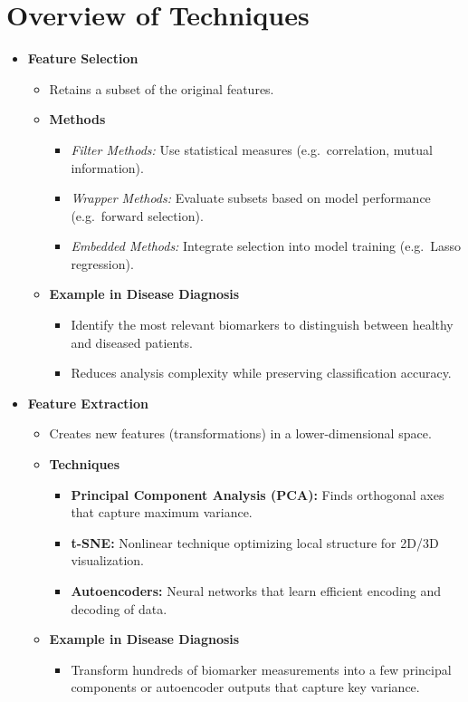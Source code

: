 \documentclass[10pt]{article}
\begin{document}
\section{Overview of Techniques}
\begin{itemize}
    \item \textbf{Feature Selection}
    \begin{itemize}
        \item Retains a subset of the original features.
        \item \textbf{Methods}
        \begin{itemize}
            \item \emph{Filter Methods:} Use statistical measures (e.g.\ correlation, mutual information).
            \item \emph{Wrapper Methods:} Evaluate subsets based on model performance (e.g.\ forward selection).
            \item \emph{Embedded Methods:} Integrate selection into model training (e.g.\ Lasso regression).
        \end{itemize}
        \item \textbf{Example in Disease Diagnosis}
        \begin{itemize}
            \item Identify the most relevant biomarkers to distinguish between healthy and diseased patients.
            \item Reduces analysis complexity while preserving classification accuracy.
        \end{itemize}
    \end{itemize}
    \item \textbf{Feature Extraction}
    \begin{itemize}
        \item Creates new features (transformations) in a lower-dimensional space.
        \item \textbf{Techniques}
        \begin{itemize}
            \item \textbf{Principal Component Analysis (PCA):} Finds orthogonal axes that capture maximum variance.
            \item \textbf{t-SNE:} Nonlinear technique optimizing local structure for 2D/3D visualization.
            \item \textbf{Autoencoders:} Neural networks that learn efficient encoding and decoding of data.
        \end{itemize}
        \item \textbf{Example in Disease Diagnosis}
        \begin{itemize}
            \item Transform hundreds of biomarker measurements into a few principal components or autoencoder outputs that capture key variance.
        \end{itemize}
    \end{itemize}
\end{itemize}
\end{document}
